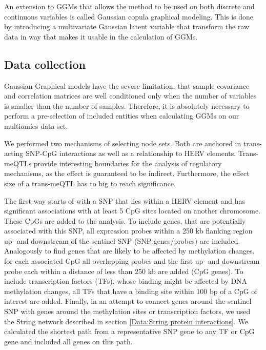 \documentclass[a4paper,12pt,twoside,openright]{report}
\begin{document}
An extension to GGMs that allows the method to be used on both discrete and continuous variables is called Gaussian copula graphical modeling. This is done by introducing a multivariate Gaussian latent variable that transform the raw data in way that makes it usable in the calculation of GGMs. 

\subsection{Data collection}
\label{Methods:Data collection}
Gaussian Graphical models have the severe limitation, that sample covariance and correlation matrices are well conditioned only when the number of variables is smaller than the number of samples\cite{Schaefer2005}. Therefore, it is absolutely necessary to perform a pre-selection of included entities when calculating GGMs on our multiomics data set.

We performed two mechanisms of selecting node sets. Both are anchored in trans-acting SNP-CpG interactions as well as a relationship to HERV elements. Trans-meQTLs provide interesting boundaries for the analysis of regulatory mechanisms, as the effect is guaranteed to be indirect. Furthermore, the effect size of a trans-meQTL has to big to reach significance. 

The first way starts of with a SNP that lies within a HERV element and has significant associations with at least 5 CpG sites located on another chromosome. These CpGs are added to the analysis.  To include genes, that are potentially associated with this SNP, all expression probes within a 250 kb flanking region up- and downstream of the sentinel SNP (SNP genes/probes) are included. Analogously to find genes that are likely to be affected by methylation changes, for each associated CpG all overlapping probes and the first up- and downstream probe each within a distance of less than 250 kb are added (CpG genes). To include transcription factors (TFs), whose binding might be affected by DNA methylation changes, all TFs that have a binding site within 100 bp of a CpG of interest are added. Finally, in an attempt to connect genes around the sentinel SNP with genes around the methylation sites or transcription factors, we used the String network described in section \ref{Data:String protein interactions}. We calculated the shortest path from a representative SNP gene to any TF or CpG gene and included all genes on this path.
\end{document}
